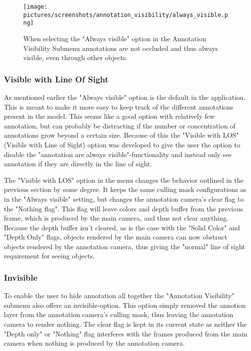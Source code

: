 \begin{figure}%
	\texttt{[image: pictures/screenshots/annotation\_visibility/always\_visible.png]}
	\caption[Annotation always visible]{When selecting the "Always visible" option in the Annotation Visibility Submenu annotations are not occluded and thus always visible, 
	even through other objects.}
	\label{fig:always_visible}
\end{figure} 

\subsubsection{Visible with Line Of Sight}
As mentioned earlier the "Always visible" option is the default in the application. This is meant to make it more easy to keep track of the different annotations 
present in the model. This seems like a good option with relatively few annotation, but can probably be distracting if the number or concentration of annotations 
grow beyond a certain size. Because of this the "Visible with LOS" (Visible with Line of Sight) option was developed to give the user the option to 
disable the "annotation are always visible"-functionality and instead only see annotation if they are directly in the line of sight.

The "Visible with LOS" option in the menu changes the behavior outlined in the previous section by some degree.
It keeps the same culling mask configurations as in the "Always visible" setting, but changes the annotation camera's clear flag to the "Nothing flag".
This flag will leave colors and depth buffer from the previous frame, which is produced by the main camera, and thus not clear anything. 
Because the depth buffer isn't cleared, as is the case with the "Solid Color" and "Depth Only" flags, objects rendered by the main camera can now
obstruct objects rendered by the annotation camera, thus giving the "normal" line of sight requirement for seeing objects. 

\subsubsection{Invisible}
To enable the user to hide annotation all together the "Annotation Visibility" submenu also offers an invisible-option. 
This option simply removed the annotion layer from the annotation camera's culling mask, thus leaving the annotation camera to render nothing.
The clear flag is kept in its current state as neither the "Depth only" or "Nothing" flag interferes with the frames produced from the main camera
when nothing is produced by the annotation camera.

